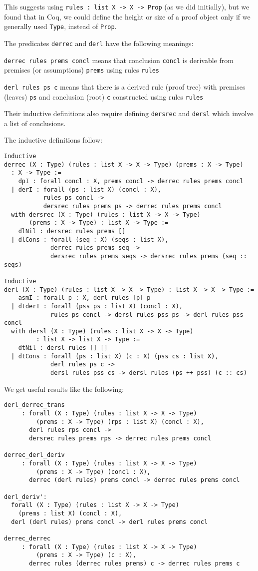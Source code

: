 \documentclass[a4paper,12pt]{llncs}
\begin{document}
This suggests using
\texttt{rules : list X -> X -> Prop}
(as we did initially), but we found that in Coq,
we could define the height or size of a proof object only if we
generally used \texttt{Type}, instead of \texttt{Prop}.

The predicates \texttt{derrec} and \texttt{derl} have the following meanings:

\texttt{derrec rules prems concl} means that conclusion
\texttt{concl}
is derivable from premises (or assumptions)
\texttt{prems}
using 
rules
\texttt{rules}

\texttt{derl rules ps c} means that there is a derived rule
(proof tree)
with premises (leaves)
\texttt{ps}
and conclusion (root)
\texttt{c}
constructed using rules
\texttt{rules}

Their inductive definitions also require defining
\texttt{dersrec} and \texttt{dersl}
which involve a list of conclusions.

The inductive definitions follow:
\begin{verbatim}
Inductive
derrec (X : Type) (rules : list X -> X -> Type) (prems : X -> Type)
  : X -> Type :=
    dpI : forall concl : X, prems concl -> derrec rules prems concl
  | derI : forall (ps : list X) (concl : X),
           rules ps concl ->
           dersrec rules prems ps -> derrec rules prems concl
  with dersrec (X : Type) (rules : list X -> X -> Type) 
       (prems : X -> Type) : list X -> Type :=
    dlNil : dersrec rules prems []
  | dlCons : forall (seq : X) (seqs : list X),
             derrec rules prems seq ->
             dersrec rules prems seqs -> dersrec rules prems (seq :: seqs)

Inductive
derl (X : Type) (rules : list X -> X -> Type) : list X -> X -> Type :=
    asmI : forall p : X, derl rules [p] p
  | dtderI : forall (pss ps : list X) (concl : X),
             rules ps concl -> dersl rules pss ps -> derl rules pss concl
  with dersl (X : Type) (rules : list X -> X -> Type)
         : list X -> list X -> Type :=
    dtNil : dersl rules [] []
  | dtCons : forall (ps : list X) (c : X) (pss cs : list X),
             derl rules ps c ->
             dersl rules pss cs -> dersl rules (ps ++ pss) (c :: cs)
\end{verbatim}

We get useful results like the following:
\begin{verbatim}
derl_derrec_trans
     : forall (X : Type) (rules : list X -> X -> Type) 
         (prems : X -> Type) (rps : list X) (concl : X),
       derl rules rps concl ->
       dersrec rules prems rps -> derrec rules prems concl

derrec_derl_deriv
     : forall (X : Type) (rules : list X -> X -> Type) 
         (prems : X -> Type) (concl : X),
       derrec (derl rules) prems concl -> derrec rules prems concl

derl_deriv':
  forall (X : Type) (rules : list X -> X -> Type) 
    (prems : list X) (concl : X),
  derl (derl rules) prems concl -> derl rules prems concl

derrec_derrec
     : forall (X : Type) (rules : list X -> X -> Type) 
         (prems : X -> Type) (c : X),
       derrec rules (derrec rules prems) c -> derrec rules prems c
\end{verbatim}
\end{document}

